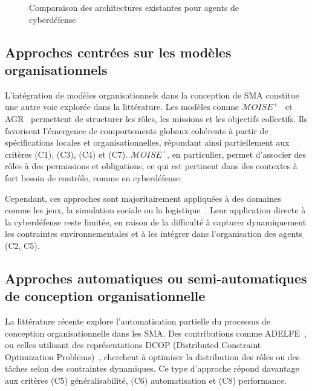 \documentclass[ twoside,openright,titlepage,numbers=noenddot,headinclude,%
                footinclude=true,cleardoublepage=empty,abstractoff, %
                BCOR=5mm,paper=a4,fontsize=11pt,%
                french,american,%
                ]{scrreprt}
\begin{document}
\begin{figure}[h]
    \centering
    \caption{Comparaison des architectures existantes pour agents de cyberdéfense}
    \label{fig:architectures-aica}
\end{figure}

\subsection*{Approches centrées sur les modèles organisationnels}

L'intégration de modèles organisationnels dans la conception de SMA constitue une autre voie explorée dans la littérature. Les modèles comme $\mathcal{M}OISE^+$~\cite{hubner2002moise} et AGR~\cite{ferber2003agr} permettent de structurer les rôles, les missions et les objectifs collectifs. Ils favorisent l'émergence de comportements globaux cohérents à partir de spécifications locales et organisationnelles, répondant ainsi partiellement aux critères (C1), (C3), (C4) et (C7). $\mathcal{M}OISE^+$, en particulier, permet d'associer des rôles à des permissions et obligations, ce qui est pertinent dans des contextes à fort besoin de contrôle, comme en cyberdéfense.

Cependant, ces approches sont majoritairement appliquées à des domaines comme les jeux, la simulation sociale ou la logistique~\cite{ricordel2000analysis}. Leur application directe à la cyberdéfense reste limitée, en raison de la difficulté à capturer dynamiquement les contraintes environnementales et à les intégrer dans l'organisation des agents (C2, C5).

\subsection*{Approches automatiques ou semi-automatiques de conception organisationnelle}

La littérature récente explore l'automatisation partielle du processus de conception organisationnelle dans les SMA. Des contributions comme ADELFE~\cite{Bernon2003}, ou celles utilisant des représentations DCOP (Distributed Constraint Optimization Problems)~\cite{modi2005adopt}, cherchent à optimiser la distribution des rôles ou des tâches selon des contraintes dynamiques. Ce type d'approche répond davantage aux critères (C5) généralisabilité, (C6) automatisation et (C8) performance.
\end{document}
